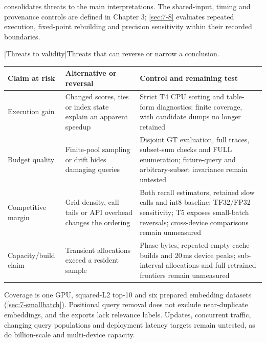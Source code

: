  consolidates threats to the main interpretations.
The shared-input, timing and provenance controls are defined in Chapter 3;
\cref{sec:7-8} evaluates repeated execution, fixed-point rebuilding and
precision sensitivity within their recorded boundaries.


\par\medskip\noindent\begin{minipage}{\linewidth}
\centering\captionsetup{hypcap=false}
[Threats to validity]{Threats that can reverse or narrow a conclusion.}
\label{tab:8-threats}
\footnotesize\setlength{\tabcolsep}{4pt}
\begin{tabularx}{\linewidth}{@{}*{3}{>{\raggedright\arraybackslash}X}@{}}
\toprule
Claim at risk & Alternative or reversal & Control and remaining test \\
\midrule
Execution gain & Changed scores, ties or index state explain an apparent
speedup & Strict T4 CPU sorting and table-form diagnostics; finite
coverage, with candidate dumps no longer retained \\
Budget quality & Finite-pool sampling or drift hides damaging queries
& Disjoint GT evaluation, full traces, subset-sum checks and FULL
enumeration; future-query and arbitrary-subset invariance remain untested \\
Competitive margin & Grid density, call tails or API overhead changes
the ordering & Both recall estimators, retained slow calls and int8
baseline; TF32/FP32 sensitivity; T5 exposes small-batch reversals;
cross-device comparisons remain unmeasured \\
Capacity/build claim & Transient allocations exceed a resident sample
& Phase bytes, repeated empty-cache builds and 20\,ms device peaks;
sub-interval allocations and full retrained frontiers remain unmeasured \\
\bottomrule
\end{tabularx}
\end{minipage}\par\medskip

Coverage is one GPU, squared-L2 top-10 and six prepared embedding
datasets (\cref{sec:7-smallbatch}). Positional query removal does not
exclude near-duplicate embeddings, and the exports lack relevance labels.
Updates, concurrent traffic, changing query populations and deployment
latency targets remain untested, as do billion-scale and multi-device
capacity.
